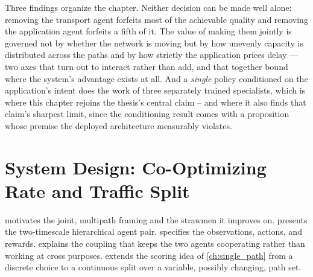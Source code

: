 Three findings organize the chapter. Neither decision can be made well alone: removing the transport
agent forfeits most of the achievable quality and removing the application agent forfeits a fifth of
it.
The value of making them jointly is governed not by whether the
network is moving but by how unevenly capacity is distributed across the paths and by how strictly the
application prices delay --- two axes that turn out to interact rather than add, and that together bound
where the system's advantage exists at all. And a \emph{single} policy conditioned on the application's intent does the
work of three separately trained specialists, which is where this chapter rejoins the thesis's central
claim -- and where it also finds that claim's sharpest limit, since the conditioning result comes with a
proposition whose premise the deployed architecture measurably violates.

\section{System Design: Co-Optimizing Rate and Traffic Split}
\label{sec:mp:design}

 motivates the joint, multipath framing and the strawmen it improves on.
 presents the two-timescale hierarchical agent pair.
 specifies the observations, actions, and rewards.
 explains the coupling that keeps the two agents cooperating rather than
working at cross purposes.  extends the scoring idea of \cref{ch:single_path}
from a discrete choice to a continuous split over a variable, possibly changing, path set.

